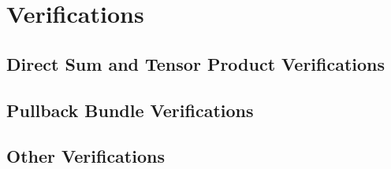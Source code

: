 \documentclass[../sean_thesis.tex]{subfiles}
\begin{document}
\section{Verifications}

\subsection{Direct Sum and Tensor Product Verifications}


\subsection{Pullback Bundle Verifications}
\label{sec:pullback}


\subsection{Other Verifications}


%
\end{document}
